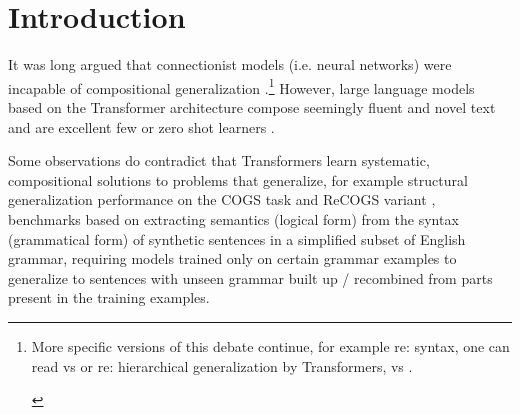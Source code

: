 \documentclass[11pt]{article}
\begin{document}
\section{Introduction}

It was long argued that connectionist models (i.e. neural networks) were incapable of compositional generalization \cite{FodorPylyshyn1988}.\footnote{\begin{footnotesize}
More specific versions of this debate continue, for example re: syntax, one can read \cite{vanschijndel2019quantitydoesntbuyquality} vs \cite{goldberg2019assessingbertssyntacticabilities} or re: hierarchical generalization by Transformers, \cite{petty2021transformersgeneralizelinearly} vs \cite{murty2023grokkinghierarchicalstructurevanilla}.\end{footnotesize}} 
However, large language models based on the Transformer architecture \cite{vaswani2017attention} compose seemingly fluent and novel text and are excellent few or zero shot learners \cite{Brown2020}.

Some observations do contradict that Transformers learn systematic, compositional solutions to problems that generalize, for example structural generalization performance on the COGS task \cite{KimLinzen2020} and ReCOGS variant \cite{Wu2023} , benchmarks based on extracting semantics (logical form) from the syntax (grammatical form) of synthetic sentences in a simplified subset of English grammar, requiring models trained only on certain grammar examples to generalize to sentences with unseen grammar built up / recombined from parts present in the training examples.
\end{document}
